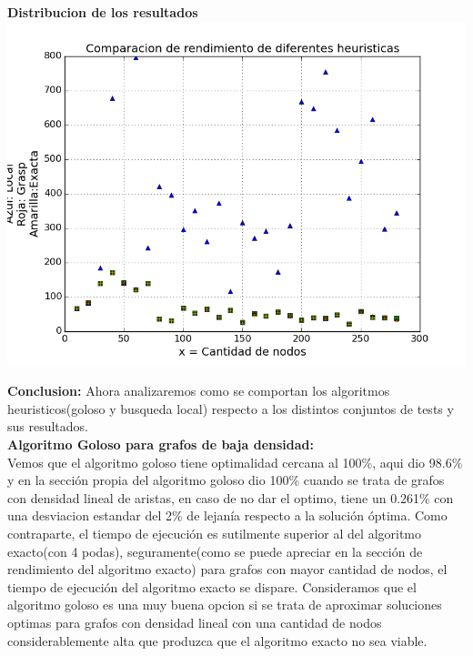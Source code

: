 \vspace{2cm}

\begin{center}	
	\textbf{Distribucion de los resultados}\\
	\includegraphics[scale=0.7]{experimentos/performance-optimalidad-cliques_beta_n_over_128/comparacion_optimalidad.png}
\end{center}


\textbf{Conclusion: } Ahora analizaremos como se comportan los algoritmos heuristicos(goloso y busqueda local) respecto a los distintos conjuntos de tests y sus resultados.\\

\vspace{0.75cm}
\textbf{Algoritmo Goloso para grafos de baja densidad:}\\
Vemos que el algoritmo goloso tiene optimalidad cercana al 100\%, aqui dio 98.6\% y en la secci\'on propia del algoritmo goloso dio 100\% cuando se trata de grafos con densidad lineal de aristas, en caso de no dar el optimo, tiene un 0.261\% con una desviacion estandar del 2\% de lejan\'ia respecto a la soluci\'on \'optima. Como contraparte, el tiempo de ejecuci\'on es sutilmente superior al del algoritmo exacto(con 4 podas), seguramente(como se puede apreciar en la secci\'on de rendimiento del algoritmo exacto) para grafos con mayor cantidad de nodos, el tiempo de ejecuci\'on del algoritmo exacto se dispare. Consideramos que el algoritmo goloso es una muy buena opcion si se trata de aproximar soluciones optimas para grafos con densidad lineal con una cantidad de nodos considerablemente alta que produzca que el algoritmo exacto no sea viable.\\

